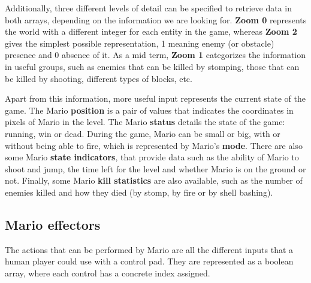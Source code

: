 \documentclass[conference]{IEEEtran}
\begin{document}
Additionally, three different levels of detail can be specified to retrieve data
in both arrays, depending on the information we are looking for. \textbf{Zoom 0}
represents the world with a different integer for each entity in the game, whereas
\textbf{Zoom 2} gives the simplest possible representation, 1 meaning enemy (or
obstacle) presence and 0 absence of it. As a mid term, \textbf{Zoom 1} categorizes
the information in useful groups, such as enemies that can be killed by
stomping, those that can be killed by shooting, different types of blocks, etc.

Apart from this information, more useful input represents the
current state of the game. The Mario \textbf{position} is a pair of
values that indicates the coordinates in pixels of Mario in the level. The
Mario \textbf{status} details the state of the game: running, win or dead. 
During the game, Mario can be small or big, with or without being able to fire, which
is represented by Mario's \textbf{mode}. There are also some Mario \textbf{state 
indicators}, that provide data such as the ability of Mario to shoot and jump, 
the time left for the level and whether Mario is on the ground or not.
Finally, some Mario \textbf{kill statistics} are also available, such as the number of enemies killed 
and how they died (by stomp, by fire or by shell bashing).

\subsection{Mario effectors} \label{subsec:marioBenchEffectors}

The actions that can be performed by Mario are all the different inputs that a
human player could use with a control pad. They are represented as a
boolean array, where each control has a concrete index assigned. 


\end{document}
